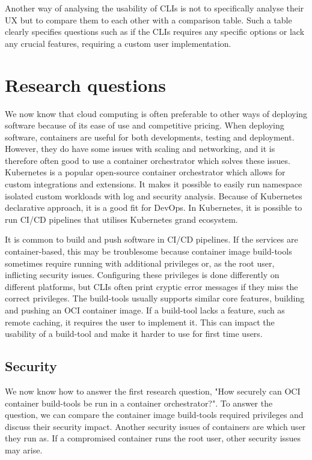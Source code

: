 Another way of analysing the usability of CLIs is not to specifically analyse their UX but to compare them to each other with a comparison table. Such a table clearly specifies questions such as if the CLIs requires any specific options or lack any crucial features, requiring a custom user implementation. 


\section{Research questions} %
We now know that cloud computing is often preferable to other ways of deploying software because of its ease of use and competitive pricing. When deploying software, containers are useful for both developments, testing and deployment. However, they do have some issues with scaling and networking, and it is therefore often good to use a container orchestrator which solves these issues. Kubernetes is a popular open-source container orchestrator which allows for custom integrations and extensions. It makes it possible to easily run namespace isolated custom workloads with log and security analysis. Because of Kubernetes declarative approach, it is a good fit for DevOps. In Kubernetes, it is possible to run CI/CD pipelines that utilises Kubernetes grand ecosystem. 

It is common to build and push software in CI/CD pipelines. If the services are container-based, this may be troublesome because container image build-tools sometimes require running with additional privileges or, as the root user, inflicting security issues. Configuring these privileges is done differently on different platforms, but CLIs often print cryptic error messages if they miss the correct privileges. The build-tools usually supports similar core features, building and pushing an OCI container image. If a build-tool lacks a feature, such as remote caching, it requires the user to implement it. This can impact the usability of a build-tool and make it harder to use for first time users. 


\subsection{Security}
We now know how to answer the first research question, "How securely can OCI container build-tools be run in a container orchestrator?". To answer the question, we can compare the container image build-tools required privileges and discuss their security impact. Another security issues of containers are which user they run as. If a compromised container runs the root user, other security issues may arise. 
